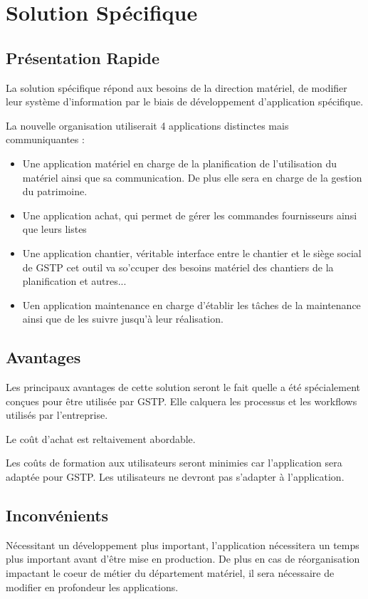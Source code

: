 \section{Solution Spécifique}

\subsection{Présentation Rapide}

La solution spécifique répond aux besoins de la direction matériel, de modifier
leur système d'information par le biais de développement d'application spécifique.

La nouvelle organisation utiliserait 4 applications distinctes mais communiquantes : 
\begin{itemize}
\item Une application matériel en charge de la planification de l'utilisation du 
matériel ainsi que sa communication. De plus elle sera en charge de la gestion du 
patrimoine.
\item Une application achat, qui permet de gérer les commandes fournisseurs ainsi que
leurs listes
\item Une application chantier, véritable interface entre le chantier et le siège 
social de GSTP cet outil va so'ccuper des besoins matériel des chantiers de la planification et autres...
\item Uen application maintenance en charge d'établir les tâches de la maintenance ainsi que de les suivre 
jusqu'à leur réalisation.
\end{itemize}

\subsection{Avantages}

Les principaux avantages de cette solution seront le fait quelle a été spécialement
conçues pour être utilisée par GSTP. Elle calquera les processus et les workflows
utilisés par l'entreprise.

Le coût d'achat est reltaivement abordable.

Les coûts de formation aux utilisateurs seront minimies car l'application sera 
adaptée pour GSTP. Les utilisateurs ne devront pas s'adapter à l'application.

\subsection{Inconvénients}

Nécessitant un développement plus important, l'application nécessitera un temps
plus important avant d'être mise en production. De plus en cas de réorganisation
impactant le coeur de métier du département matériel, il sera nécessaire de modifier
en profondeur les applications. 
